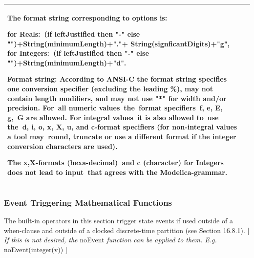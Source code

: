 \documentclass[10pt,a4paper]{report}
\def\doublelabel#1{\label{#1}\hypertarget{#1}{}}
\begin{document}
\begin{longtable}{|p{3.5cm}|p{8cm}|}
The format string corresponding to options is:


for Reals:~(if leftJustified then "-" else
  "")+String(minimumLength)+"."+ String(signficantDigits)+"g",
for Integers:~(if leftJustified then "-" else
  "")+String(minimumLength)+"d".

Format string: According to ANSI-C the format string specifies one
conversion specifier (excluding the leading \%), may not contain length
modifiers, and may not use "*" for width and/or precision. For~all
numeric values~the~format specifiers~f, e, E, g,~G are allowed. For
integral values~it is also allowed to~use the~d, i, o, x, X, u, and
c-format specifiers (for non-integral values a tool may~round, truncate
or use a different format if the integer conversion characters are
used).

The x,X-formats (hexa-decimal)~and c (character) for Integers does not
lead to input~that agrees with the Modelica-grammar.\\ \hline
\end{longtable}
\subsubsection{Event Triggering Mathematical Functions}\doublelabel{event-triggering-mathematical-functions}

The built-in operators in this section trigger state events if used
outside of a when-clause and outside of a clocked discrete-time
partition (see Section 16.8.1). {[} \emph{If this is not desired, the}
noEvent \emph{function can be applied to them. E.g.} noEvent(integer(v))
{]}
\end{document}

